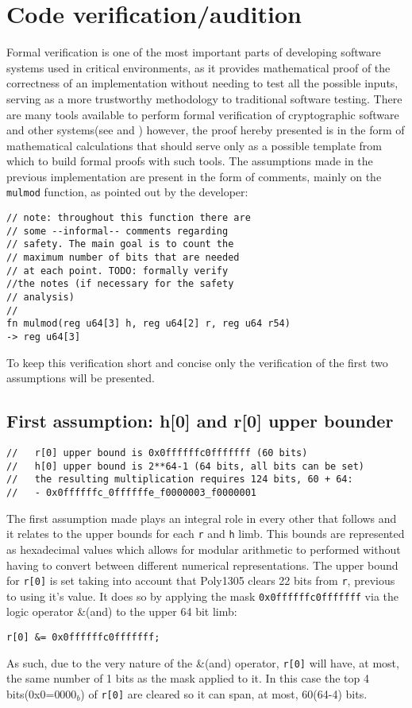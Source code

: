\documentclass{article}
\begin{document}
\section{Code verification/audition}
Formal verification is one of the most important parts of developing software systems used in critical environments, as it provides mathematical proof of the
correctness of an implementation without needing to test all the possible inputs, serving as a more trustworthy methodology to traditional software 
testing. There are many tools available to perform formal verification of cryptographic software and other systems(see \cite{coq_proof} and \cite{easycrypt}) 
however, the proof hereby presented is in the form of mathematical calculations that should serve only as a possible template from which to build formal proofs 
with such tools. The assumptions made in the previous implementation are present in the form of comments, mainly on the \texttt{mulmod} function, as pointed out 
by the developer:
\begin{Verbatim}
// note: throughout this function there are 
// some --informal-- comments regarding
// safety. The main goal is to count the 
// maximum number of bits that are needed
// at each point. TODO: formally verify 
//the notes (if necessary for the safety
// analysis)
//
fn mulmod(reg u64[3] h, reg u64[2] r, reg u64 r54) 
-> reg u64[3]
\end{Verbatim}

To keep this verification short and concise only the verification of the first two assumptions will be presented.

\subsection{First assumption: h[0] and r[0] upper bounder}
\begin{Verbatim}
//   r[0] upper bound is 0x0ffffffc0fffffff (60 bits)
//   h[0] upper bound is 2**64-1 (64 bits, all bits can be set)
//   the resulting multiplication requires 124 bits, 60 + 64:
//   - 0x0ffffffc_0ffffffe_f0000003_f0000001
\end{Verbatim}
The first assumption made plays an integral role in every other that follows and it relates to the upper bounds for each \texttt{r} and \texttt{h} limb. 
This bounds are represented as hexadecimal values which allows for modular arithmetic to performed without having to convert between different numerical 
representations. The upper bound for \texttt{r[0]} is set taking into account that Poly1305 clears 22 bits from \texttt{r}, previous to using it's value. It does so by applying 
the mask \texttt{0x0ffffffc0fffffff} via the logic operator \&(and) to the upper 64 bit limb: 
\begin{Verbatim}
r[0] &= 0x0ffffffc0fffffff;
\end{Verbatim}
As such, due to the very nature of the \&(and) operator, \texttt{r[0]} will have, at most, the same number of 1 bits as the mask applied to it. In this case 
the top 4 bits(0x0=$0000_b$) of \texttt{r[0]} are cleared so it can span, at most, 60(64-4) bits.
\end{document}
